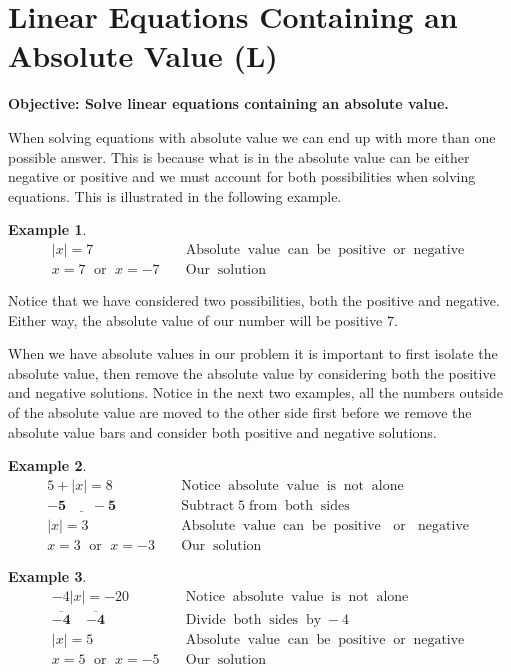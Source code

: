 \documentclass[12pt]{book}
\theoremstyle{definition}
\newtheorem{example}{Example}
\newcommand{\tmmathbf}[1]{\ensuremath{\boldsymbol{#1}}}
\newcommand{\tmop}[1]{\ensuremath{\operatorname{#1}}}
\begin{document}
\section{Linear Equations Containing an Absolute Value (L)}
{\bf Objective: Solve linear equations containing an absolute value.}\par
When solving equations with absolute value we can end up with more than one possible answer. This is because what is in the absolute value can be either negative or positive and we must account for both possibilities when solving equations. This is illustrated in the following example.
\begin{example}\label{Lin34}
  \begin{eqnarray*}
    |x| = 7 &  & \tmop{Absolute} \tmop{value} \tmop{can} \tmop{be}
    \tmop{positive} \tmop{or} \tmop{negative}\\
    x = 7 \tmop{~or~} x = - 7 &  & \tmop{Our} \tmop{solution}
  \end{eqnarray*}
\end{example}
Notice that we have considered two possibilities, both the positive and negative. Either way, the absolute value of our number will be positive $7$.\par
When we have absolute values in our problem it is important to first isolate the absolute value, then remove the absolute value by considering both the positive and negative solutions. Notice in the next two examples, all the numbers outside of the absolute value are moved to the other side first before we remove the absolute value bars and consider both positive and negative solutions.
\begin{example}\label{Lin35}
  \begin{eqnarray*}
    5 + |x| = 8~~ &  & \tmop{Notice} \tmop{absolute} \tmop{value} \tmop{is}
    \tmop{not} \tmop{alone}\\
    \tmmathbf{\underline{- 5 ~~~~~~~~- 5}} &  & \tmop{Subtract} 5 \tmop{from}
    \tmop{both} \tmop{sides}\\
    |x| = 3~ &  & \tmop{Absolute} \tmop{value} \tmop{can} \tmop{be}
    \tmop{positive} \tmop{~or~} \tmop{negative}\\
    x = 3 \tmop{~or~} x = - 3 &  & \tmop{Our} \tmop{solution}
  \end{eqnarray*}
\end{example}
\begin{example}\label{Lin36}
  \begin{eqnarray*}
    - 4 |x| = - 20 &  & \tmop{Notice} \tmop{absolute} \tmop{value} \tmop{is}
    \tmop{not} \tmop{alone}\\
    \tmmathbf{\overline{- 4} ~~~~~ \overline{- 4}}~ &  & \tmop{Divide} \tmop{both}
    \tmop{sides} \tmop{by} - 4\\
    |x| = 5 &  & \tmop{Absolute} \tmop{value} \tmop{can} \tmop{be}
    \tmop{positive} \tmop{or} \tmop{negative}\\
    x = 5 \tmop{~or~} x = - 5 &  & \tmop{Our} \tmop{solution}
  \end{eqnarray*}
\end{example}
\end{document}
